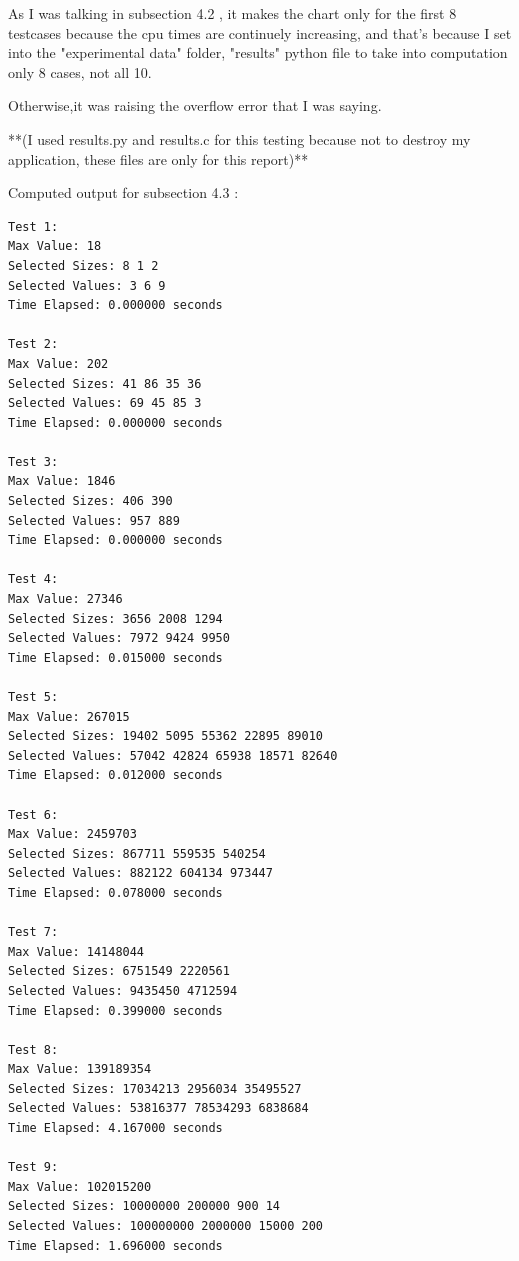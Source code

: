 \documentclass{article}%
\begin{document}
As I was talking in subsection 4.2 , it makes the chart only for the first 8 testcases because the cpu times are continuely increasing,
and that's because I set into the "experimental data" folder, "results" python file to take into computation only 8 cases, not all 10. 

Otherwise,it was raising the overflow error that I was saying. 
                        

**(I used results.py and results.c for this testing because not to destroy my application, these files are only for this report)**
                        
    \vspace*{\fill}

    
%
\newpage%


   \vspace*{\fill}
                        
Computed output for subsection 4.3 :
                        
\small
\begin{verbatim}
Test 1:
Max Value: 18
Selected Sizes: 8 1 2 
Selected Values: 3 6 9 
Time Elapsed: 0.000000 seconds
                        
Test 2:
Max Value: 202
Selected Sizes: 41 86 35 36 
Selected Values: 69 45 85 3 
Time Elapsed: 0.000000 seconds
                        
Test 3:
Max Value: 1846
Selected Sizes: 406 390 
Selected Values: 957 889 
Time Elapsed: 0.000000 seconds
                        
Test 4:
Max Value: 27346
Selected Sizes: 3656 2008 1294 
Selected Values: 7972 9424 9950 
Time Elapsed: 0.015000 seconds
                        
Test 5:
Max Value: 267015
Selected Sizes: 19402 5095 55362 22895 89010 
Selected Values: 57042 42824 65938 18571 82640 
Time Elapsed: 0.012000 seconds
                        
Test 6:
Max Value: 2459703
Selected Sizes: 867711 559535 540254 
Selected Values: 882122 604134 973447 
Time Elapsed: 0.078000 seconds
                        
Test 7:
Max Value: 14148044
Selected Sizes: 6751549 2220561 
Selected Values: 9435450 4712594 
Time Elapsed: 0.399000 seconds
                        
Test 8:
Max Value: 139189354
Selected Sizes: 17034213 2956034 35495527 
Selected Values: 53816377 78534293 6838684 
Time Elapsed: 4.167000 seconds
                        
Test 9:
Max Value: 102015200
Selected Sizes: 10000000 200000 900 14 
Selected Values: 100000000 2000000 15000 200 
Time Elapsed: 1.696000 seconds
                        
\end{verbatim}
                        
\end{document}
